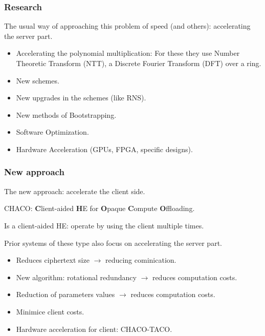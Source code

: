 \documentclass[10pt,handout]{beamer}
\begin{document}
\begin{frame}
\frametitle{Research}

    The usual way of approaching this problem of speed (and others):  accelerating the server
    part.
\begin{itemize}
   \item Accelerating the polynomial multiplication:
    For these they use Number Theoretic Transform (NTT), a Discrete Fourier Transform (DFT) over a ring.
    \item New schemes.
    \item New upgrades in the schemes (like RNS).
   \item New methods of Bootstrapping.
   \item Software Optimization.
   \item Hardware Acceleration (GPUs, FPGA, specific designs).
\end{itemize}

\end{frame}


\begin{frame}
\frametitle{New approach}


    The new approach:  accelerate the client side.

    CHACO: \textbf{C}lient-aided \textbf{H}E for \textbf{O}paque \textbf{C}ompute \textbf{O}ffloading.


    Is a client-aided HE: operate by using the client multiple times.

    Prior systems of these type also focus on accelerating the server part.

    \begin{itemize}
        \item Reduces ciphertext size $\rightarrow$ reducing cominication.
        \item New algorithm: rotational redundancy $\rightarrow$ reduces computation costs.
        \item Reduction of parameters values $\rightarrow$ reduces computation costs.
        \item Minimice client costs.
        \item Hardware acceleration for client: CHACO-TACO.
    \end{itemize}


\end{frame}
\end{document}
